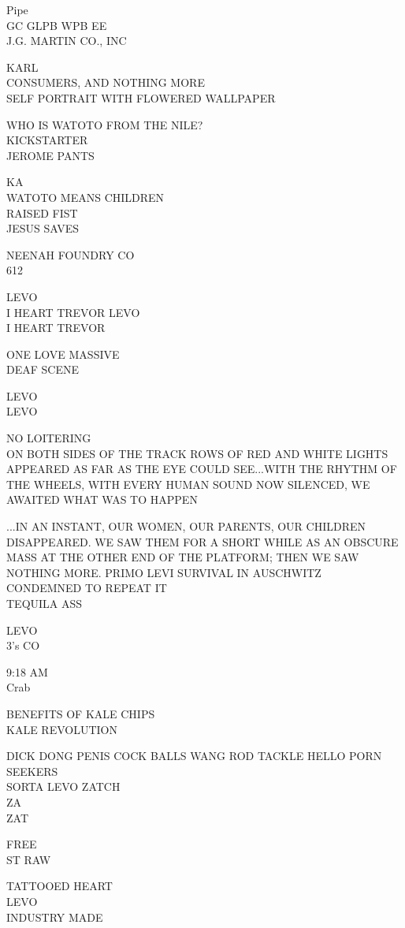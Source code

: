 \documentclass[10pt,letterpaper]{article}
\begin{document}
Pipe\\
GC GLPB WPB EE\\
J.G. MARTIN CO., INC

KARL\\
CONSUMERS, AND NOTHING MORE\\
SELF PORTRAIT WITH FLOWERED WALLPAPER

WHO IS WATOTO FROM THE NILE?\\
KICKSTARTER\\
JEROME PANTS

KA\\
WATOTO MEANS CHILDREN\\
RAISED FIST\\
JESUS SAVES

NEENAH FOUNDRY CO\\
612

LEVO\\
I HEART TREVOR LEVO\\
I HEART TREVOR

ONE LOVE MASSIVE\\
DEAF SCENE

LEVO\\
LEVO

NO LOITERING\\
ON BOTH SIDES OF THE TRACK ROWS OF RED AND WHITE LIGHTS APPEARED AS FAR AS THE EYE COULD SEE...WITH THE RHYTHM OF THE WHEELS, WITH EVERY HUMAN SOUND NOW SILENCED, WE AWAITED WHAT WAS TO HAPPEN

...IN AN INSTANT, OUR WOMEN, OUR PARENTS, OUR CHILDREN DISAPPEARED.  WE SAW THEM FOR A SHORT WHILE AS AN OBSCURE MASS AT THE OTHER END OF THE PLATFORM; THEN WE SAW NOTHING MORE.  PRIMO LEVI  SURVIVAL IN AUSCHWITZ\\
CONDEMNED TO REPEAT IT\\
TEQUILA ASS

LEVO\\
3's CO

9:18 AM\\
Crab

BENEFITS OF KALE CHIPS\\
KALE REVOLUTION

DICK DONG PENIS COCK BALLS WANG ROD TACKLE HELLO PORN SEEKERS\\
SORTA LEVO ZATCH\\
ZA\\
ZAT

FREE\\
ST RAW

TATTOOED HEART\\
LEVO\\
INDUSTRY MADE
\end{document}
